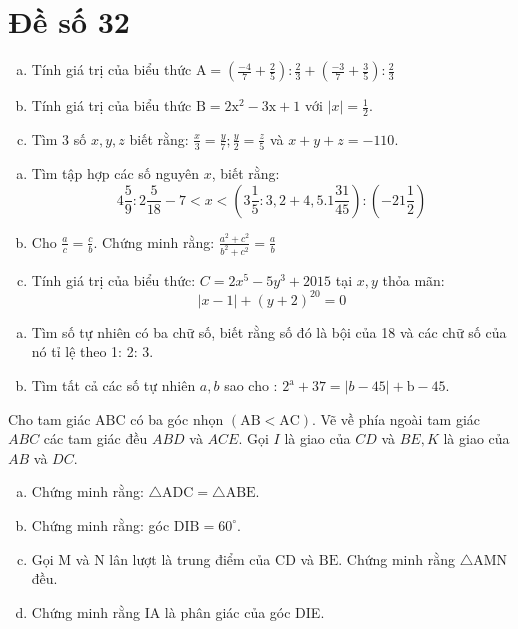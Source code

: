 \section{Đề số 32}

\begin{bt} 
	\hfill
	\begin{enumerate}[a.]
		\item Tính giá trị của biểu thức $\mathrm{A}=\left(\frac{-4}{7}+\frac{2}{5}\right): \frac{2}{3}+\left(\frac{-3}{7}+\frac{3}{5}\right): \frac{2}{3}$
		\item Tính giá trị của biểu thức $\mathrm{B}=2 \mathrm{x}^2-3 \mathrm{x}+1$ với $|x|=\frac{1}{2}$.
		\item Tìm 3 số $x, y, z$ biết rằng: $\frac{x}{3}=\frac{y}{7} ; \frac{y}{2}=\frac{z}{5}$ và $x+y+z=-110$.
	\end{enumerate}
	\loigiai{} 
\end{bt}

\begin{bt}
	\hfill
	\begin{enumerate}[a.]
		\item Tìm tập hợp các số nguyên $x$, biết rằng:
		$$
		4 \frac{5}{9}: 2 \frac{5}{18}-7<x<\left(3 \frac{1}{5}: 3,2+4,5.1 \frac{31}{45}\right):\left(-21 \frac{1}{2}\right)
		$$
		\item Cho $\frac{a}{c}=\frac{c}{b}$. Chứng minh rằng: $\frac{a^2+c^2}{b^2+c^2}=\frac{a}{b}$
		\item Tính giá trị của biểu thức: $C=2 x^5-5 y^3+2015$ tại $x, y$ thỏa mãn:
		$$	|x-1|+(y+2)^{20}=0 $$
	\end{enumerate}
	\loigiai{} 
\end{bt}

\begin{bt}
	\hfill 
	\begin{enumerate}[a.]
		\item Tìm số tự nhiên có ba chữ số, biết rằng số đó là bội của 18 và các chữ số của nó tỉ lệ theo 1: 2: 3.
		\item Tìm tất cả các số tự nhiên $a, b$ sao cho : $2^{\mathrm{a}}+37=|b-45|+\mathrm{b}-45$.
	\end{enumerate}
	\loigiai{} 
\end{bt}

\begin{bt}
	Cho tam giác $\mathrm{ABC}$ có ba góc nhọn $(\mathrm{AB}<\mathrm{AC})$. Vẽ về phía ngoài tam giác $A B C$ các tam giác đều $A B D$ và $A C E$. Gọi $I$ là giao của $C D$ và $B E, K$ là giao của $A B$ và $D C$.
	\begin{enumerate}[a.]
		\item Chứng minh rằng: $\triangle \mathrm{ADC}=\triangle \mathrm{ABE}$.
		\item Chứng minh rằng: góc $\mathrm{DIB}=60^{\circ}$.
		\item Gọi $\mathrm{M}$ và $\mathrm{N}$ lân lượt là trung điểm của $\mathrm{CD}$ và $\mathrm{BE}$. Chứng minh rằng $\triangle \mathrm{AMN}$ đều.
		\item Chứng minh rằng IA là phân giác của góc DIE.
	\end{enumerate}
	\loigiai{}
\end{bt}

